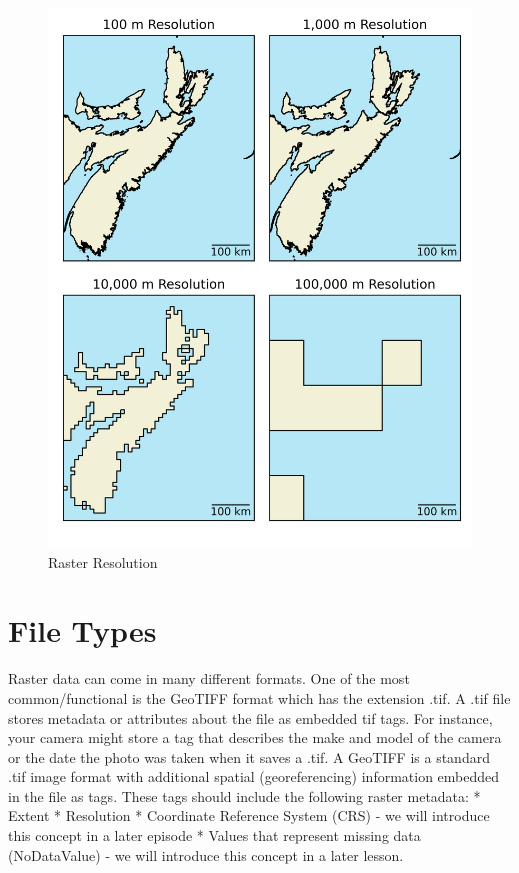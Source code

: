 \documentclass[
]{book}
\begin{document}
\begin{figure}
\centering
\includegraphics{images/03-raster-resolution.png}
\caption{Raster Resolution}
\end{figure}

\hypertarget{file-types}{%
\section{File Types}\label{file-types}}

Raster data can come in many different formats. One of the most common/functional is the GeoTIFF format which has the extension .tif. A .tif file stores metadata or attributes about the file as embedded tif tags. For instance, your camera might store a tag that describes the make and model of the camera or the date the photo was taken when it saves a .tif. A GeoTIFF is a standard .tif image format with additional spatial (georeferencing) information embedded in the file as tags. These tags should include the following raster metadata:
* Extent
* Resolution
* Coordinate Reference System (CRS) - we will introduce this concept in a later episode
* Values that represent missing data (NoDataValue) - we will introduce this concept in a later lesson.
\end{document}
